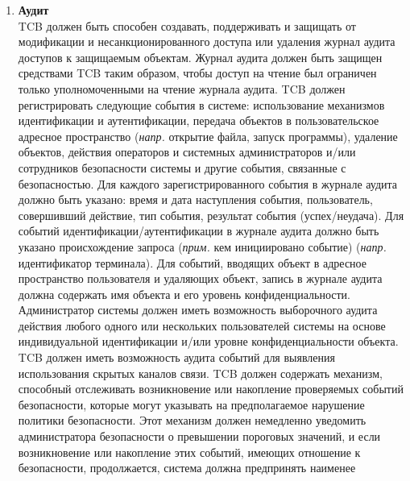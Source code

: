 \begin{enumerate}
\begin{enumerate}
\begin{enumerate}
\begin{enumerate}
                TCB должен поддерживать доверенный канал связи между собой и пользователями для исполльзования прии необходимости (\textit{напр.} вход в систему, изменение уровня конфиденциальности
                субъекта). Связь по этому доверенному каналу должна активироваться исключительно пользователем TCB и должна быть логически изолирована и безошибочно отличима от других каналов.
                \item{\textbf{Аудит}}\\
                TCB должен быть способен создавать, поддерживать и защищать от модификации и несанкционированного доступа или удаления журнал аудита доступов к защищаемым объектам. Журнал аудита
                должен быть защищен средствами TCB таким образом, чтобы доступ на чтение был ограничен только уполномоченными на чтение журнала аудита. TCB должен регистрировать следующие события
                в системе: использование механизмов идентификации и аутентификации, передача объектов в пользовательское адресное пространство (\textit{напр.} открытие файла, запуск программы),
                удаление объектов, действия операторов и системных администраторов и/или сотрудников безопасности системы и другие события, связанные с безопасностью. Для каждого зарегистрированного
                события в журнале аудита должно быть указано: время и дата наступления события, пользователь, совершивший действие, тип события, результат события (успех/неудача). Для событий
                идентификации/аутентификации в журнале аудита должно быть указано происхождение запроса (\textit{прим.} кем инициировано событие) (\textit{напр.} идентификатор терминала). Для событий,
                вводящих объект в адресное пространство пользователя и удаляющих объект, запись в журнале аудита должна содержать имя объекта и его уровень конфиденциальности. Администратор
                системы должен иметь возможность выборочного аудита действия любого одного или нескольких пользователей системы на основе индивидуальной идентификации и/или уровне конфиденциальности объекта.
                TCB должен иметь возможность аудита событий для выявления использования скрытых каналов связи. TCB должен содержать механизм, способный отслеживать возникновение или накопление
                проверяемых событий безопасности, которые могут указывать на предполагаемое нарушение политики безопасности. Этот механизм должен немедленно уведомить администратора безопасности
                о превышении пороговых значений, и если возникновение или накопление этих событий, имеющих отношение к безопасности, продолжается, система должна предпринять наименее

\end{enumerate}
\end{enumerate}
\end{enumerate}
\end{enumerate}
